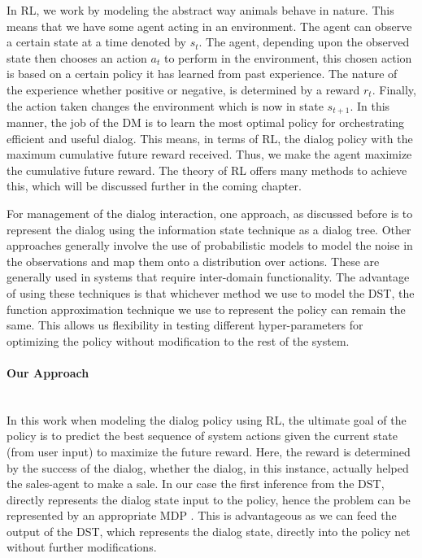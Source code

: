 \documentclass[12pt]{extarticle}
\newcommand{\myparagraph}[1]{\paragraph{#1}\mbox{}\\ \linebreak}
\numberwithin{equation}{section}
\begin{document}
	In RL, we work by modeling the abstract way animals behave in nature. This means that we have some agent acting in an environment. The agent can observe a certain state at a time denoted by $s_t$. The agent, depending upon the observed state then chooses an action $a_t$ to perform in the environment, this chosen action is based on a certain policy it has learned from past experience. The nature of the experience whether positive or negative, is determined by a reward $r_t$. Finally, the action taken changes the environment which is now in state $s_{t+1}$. In this manner, the job of the DM is to learn the most optimal policy for orchestrating efficient and useful dialog. This means, in terms of RL, the dialog policy with the maximum cumulative future reward received. Thus, we make the agent maximize the cumulative future reward. The theory of RL \cite{Sutton-introRL} offers many methods to achieve this\cite{DBLP:journals/corr/abs-1711-01731}, which will be discussed further in the coming chapter. \par
	For management of the dialog interaction, one approach, as discussed before is to represent the dialog using the information state technique as a dialog tree. Other approaches generally involve the use of probabilistic models to model the noise in the observations and map them onto a distribution over actions. These are generally used in systems that require inter-domain functionality\cite{henderson_interdomain}. The advantage of using these techniques is that whichever method we use to model the DST, the function approximation technique we use to represent the policy can remain the same. This allows us flexibility in testing different hyper-parameters for optimizing the policy without modification to the rest of the system.
	\myparagraph{Our Approach}
	In this work when modeling the dialog policy using RL, the ultimate goal of the policy is to predict the best sequence of system actions given the current  state (from user input) to maximize the future reward.
	Here, the reward is determined by the success of the dialog, whether the dialog, in this instance, actually helped the sales-agent to make a sale. In our case the first inference from the DST, directly represents the dialog state input to the policy, hence the problem can be represented by an appropriate MDP \cite{mdp-pieraccini}. This is advantageous as we can feed the output of the DST, which represents the dialog state, directly into the policy net without further modifications.
\end{document}
